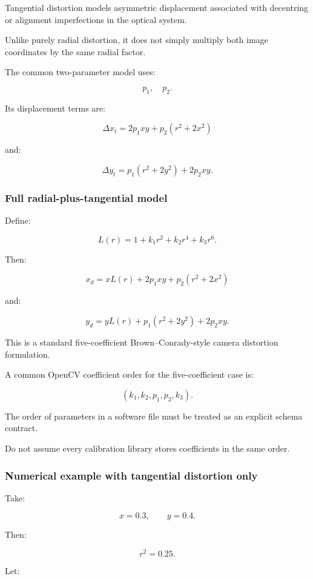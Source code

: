 Tangential distortion models asymmetric displacement associated with decentring or alignment imperfections in the optical system.

Unlike purely radial distortion, it does not simply multiply both image coordinates by the same radial factor.

The common two-parameter model uses:

\[
 p_1,\quad p_2.
\]

Its displacement terms are:

\[
 \boxed{ \Delta x_t= 2p_1xy+p_2(r^2+2x^2) }
\]

and:

\[
 \boxed{ \Delta y_t= p_1(r^2+2y^2)+2p_2xy }.
\]

\subsubsection{Full radial-plus-tangential model}\label{full-radial-plus-tangential-model}

Define:

\[
 L(r)=1+k_1r^2+k_2r^4+k_3r^6.
\]

Then:

\[
 \boxed{ x_d= xL(r)+2p_1xy+p_2(r^2+2x^2) }
\]

and:

\[
 \boxed{ y_d= yL(r)+p_1(r^2+2y^2)+2p_2xy }.
\]

This is a standard five-coefficient Brown--Conrady-style camera distortion formulation.

A common OpenCV coefficient order for the five-coefficient case is:

\[
 \boxed{ (k_1,k_2,p_1,p_2,k_3) }.
\]

The order of parameters in a software file must be treated as an explicit schema contract.

Do not assume every calibration library stores coefficients in the same order.

\subsubsection{Numerical example with tangential distortion only}\label{numerical-example-with-tangential-distortion-only}

Take:

\[
 x=0.3,\qquad y=0.4.
\]

Then:

\[
 r^2=0.25.
\]

Let:

